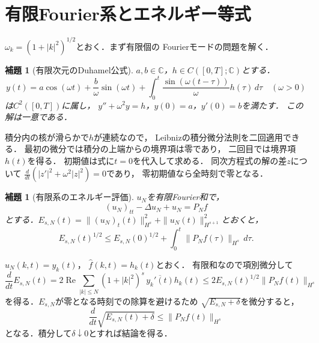 \documentclass[a5paper,10pt,onecolumn]{jsarticle}
\makeatletter
\theoremstyle{mathnotetheorem}
\newtheorem{lemma}[theorem]{補題}
\renewcommand{\proofname}{証明}
\renewenvironment{proof}[1][\proofname]{%
  \par\pushQED{\qed}\normalfont\topsep4\p@\@plus2\p@\relax
  \trivlist\item[\hskip\labelsep\bfseries #1]\ignorespaces
}{\popQED\endtrivlist\@endpefalse}
\makeatother
\begin{document}
\section{有限Fourier系とエネルギー等式}
$\omega_k=(1+|k|^2)^{1/2}$とおく．まず有限個の
Fourierモードの問題を解く．

\begin{lemma}[有限次元のDuhamel公式]\label{lem:duhamel}
$a,b\in\mathbb C$，$h\in C([0,T];\mathbb C)$とする．
\[
 y(t)=a\cos(\omega t)+\frac b\omega\sin(\omega t)
 +\int_0^t\frac{\sin(\omega(t-\tau))}{\omega}
 h(\tau)\,d\tau\quad(\omega>0)
\]
は$C^2([0,T])$に属し，
$y''+\omega^2y=h$，$y(0)=a$，$y'(0)=b$を満たす．
この解は一意である．
\end{lemma}
\begin{proof}
積分内の核が滑らかで$h$が連続なので，
Leibnizの積分微分法則を二回適用できる．
最初の微分では積分の上端からの境界項は零であり，
二回目では境界項$h(t)$を得る．
初期値は式に$t=0$を代入して求める．
同次方程式の解の差$z$について
$\frac d{dt}(|z'|^2+\omega^2|z|^2)=0$であり，
零初期値なら全時刻で零となる．
\end{proof}

\begin{lemma}[有限系のエネルギー評価]\label{lem:energy}
$u_N$を有限Fourier和で，
\[
 (u_N)_{tt}-\Delta u_N+u_N=P_Nf
\]
とする．$E_{s,N}(t)=\|(u_N)_t(t)\|_{H^s}^2+
\|u_N(t)\|_{H^{s+1}}^2$とおくと，
\[
 E_{s,N}(t)^{1/2}\le
 E_{s,N}(0)^{1/2}+\int_0^t\|P_Nf(\tau)\|_{H^s}\,d\tau.
\]
\end{lemma}
\begin{proof}
$\widehat u_N(k,t)=y_k(t)$，
$\widehat f(k,t)=h_k(t)$とおく．
有限和なので項別微分して
\[
 \frac d{dt} E_{s,N}(t)
 =2\operatorname{Re}\sum_{|k|\le N}
 (1+|k|^2)^s\,\overline{y_k'(t)}h_k(t)
 \le2 E_{s,N}(t)^{1/2}\|P_N f(t)\|_{H^s}
\]
を得る．$E_{s,N}$が零となる時刻での除算を避けるため
$\sqrt{E_{s,N}+\delta}$を微分すると，
\[
 \frac d{dt}\sqrt{E_{s,N}(t)+\delta}
 \le\|P_N f(t)\|_{H^s}
\]
となる．積分して$\delta\downarrow0$とすれば結論を得る．
\end{proof}
\end{document}
